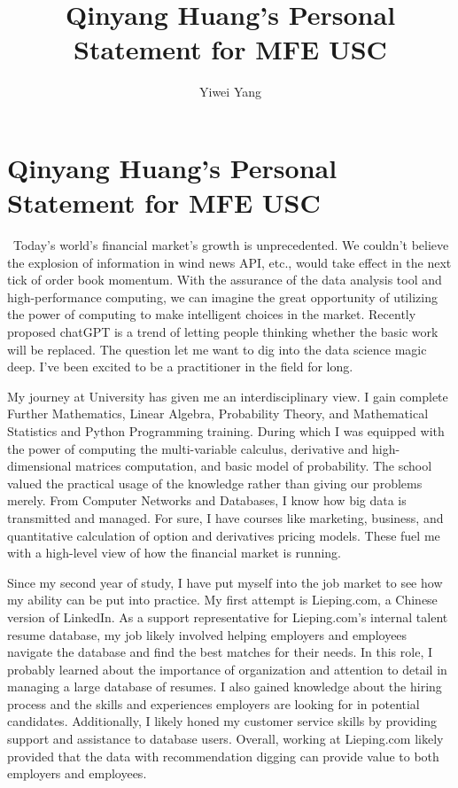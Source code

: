 \documentclass[a4paper,english]{article}
\title{Qinyang Huang's Personal Statement for MFE USC}
\author{Yiwei Yang}
\def\centersec#1{\centering#1} %
\begin{document}
\section*{\centersec{Qinyang Huang's Personal Statement for MFE USC}}
\quad\ Today's world's financial market's growth is unprecedented. We couldn't believe the explosion of information in wind news API, etc., would take effect in the next tick of order book momentum. With the assurance of the data analysis tool and high-performance computing, we can imagine the great opportunity of utilizing the power of computing to make intelligent choices in the market. Recently proposed chatGPT is a trend of letting people thinking whether the basic work will be replaced. The question let me want to dig into the data science magic deep. I've been excited to be a practitioner in the field for long.

My journey at University has given me an interdisciplinary view. I gain complete Further Mathematics, Linear Algebra, Probability Theory, and Mathematical Statistics and Python Programming training. During which I was equipped with the power of computing the multi-variable calculus, derivative and high-dimensional matrices computation, and basic model of probability. The school valued the practical usage of the knowledge rather than giving our problems merely. From Computer Networks and Databases, I know how big data is transmitted and managed. For sure, I have courses like marketing, business, and quantitative calculation of option and derivatives pricing models. These fuel me with a high-level view of how the financial market is running.

Since my second year of study, I have put myself into the job market to see how my ability can be put into practice. My first attempt is Lieping.com, a Chinese version of LinkedIn. As a support representative for Lieping.com's internal talent resume database, my job likely involved helping employers and employees navigate the database and find the best matches for their needs. In this role, I probably learned about the importance of organization and attention to detail in managing a large database of resumes. I also gained knowledge about the hiring process and the skills and experiences employers are looking for in potential candidates. Additionally, I likely honed my customer service skills by providing support and assistance to database users. Overall, working at Lieping.com likely provided that the data with recommendation digging can provide value to both employers and employees. 
\end{document}

